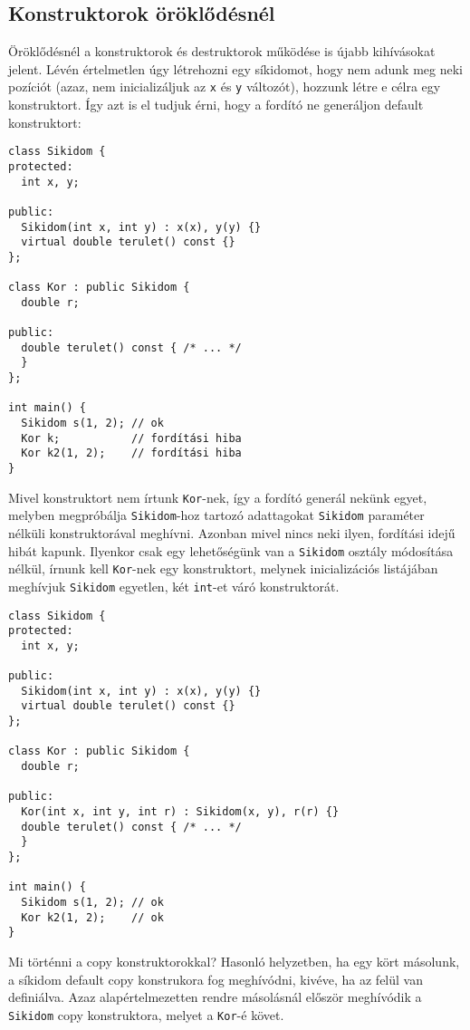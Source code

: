 \documentclass[../cpp_book/cpp_book.tex]{subfiles}
\begin{document}
	\subsection{Konstruktorok öröklődésnél}
	Öröklődésnél a konstruktorok és destruktorok működése is újabb kihívásokat jelent. Lévén értelmetlen úgy létrehozni egy síkidomot, hogy nem adunk meg neki pozíciót (azaz, nem inicializáljuk az \texttt{x} és \texttt{y} változót), hozzunk létre e célra egy konstruktort. Így azt is el tudjuk érni, hogy a fordító ne generáljon default konstruktort:
	\begin{lstlisting}
class Sikidom {
protected:
  int x, y;

public:
  Sikidom(int x, int y) : x(x), y(y) {}
  virtual double terulet() const {}
};

class Kor : public Sikidom {
  double r;

public:
  double terulet() const { /* ... */
  }
};

int main() {
  Sikidom s(1, 2); // ok
  Kor k;           // fordítási hiba
  Kor k2(1, 2);    // fordítási hiba
}
	\end{lstlisting}
	Mivel konstruktort nem írtunk \texttt{Kor}-nek, így a fordító generál nekünk egyet, melyben megpróbálja \texttt{Sikidom}-hoz tartozó adattagokat \texttt{Sikidom} paraméter nélküli konstruktorával meghívni. Azonban mivel nincs neki ilyen, fordítási idejű hibát kapunk. Ilyenkor csak egy lehetőségünk van a \texttt{Sikidom} osztály módosítása nélkül, írnunk kell \texttt{Kor}-nek egy konstruktort, melynek inicializációs listájában meghívjuk \texttt{Sikidom} egyetlen, két \texttt{int}-et váró konstruktorát.
\begin{lstlisting}
class Sikidom {
protected:
  int x, y;

public:
  Sikidom(int x, int y) : x(x), y(y) {}
  virtual double terulet() const {}
};

class Kor : public Sikidom {
  double r;

public:
  Kor(int x, int y, int r) : Sikidom(x, y), r(r) {}
  double terulet() const { /* ... */
  }
};

int main() {
  Sikidom s(1, 2); // ok
  Kor k2(1, 2);    // ok
}
\end{lstlisting}
	Mi történni a copy konstruktorokkal? Hasonló helyzetben, ha egy kört másolunk, a síkidom default copy konstrukora fog meghívódni, kivéve, ha az felül van definiálva. Azaz alapértelmezetten rendre másolásnál először meghívódik a \texttt{Sikidom} copy konstruktora, melyet a \texttt{Kor}-é követ.
	
\end{document}

